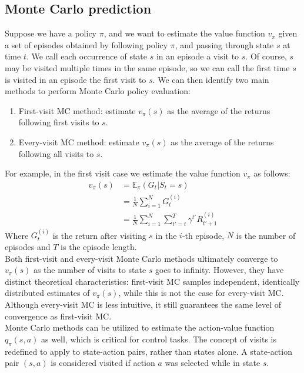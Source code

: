 \subsection{Monte Carlo prediction}
Suppose we have a policy $\pi$, and we want to estimate the value function $v_{\pi}$ given a set of episodes obtained by following policy $\pi$, and passing through state $s$ at time $t$. We call each occurrence of state $s$ in an episode a visit to $s$. Of course, $s$ may be visited multiple times in the same episode, so we can call the first time $s$ is visited in an episode the first visit to $s$. We can then identify two main methods to perform Monte Carlo policy evaluation:
\begin{enumerate}
    \item First-visit MC method: estimate $v_{\pi}(s)$ as the average of the returns following first visits to $s$.
    \item Every-visit MC method: estimate $v_{\pi}(s)$ as the average of the returns following all visits to $s$.
\end{enumerate}
For example, in the first visit case we estimate the value function $v_{\pi}$ as follows:
\begin{equation}
    \begin{split}
    v_{\pi}(s) & = \mathds{E}_{\pi}(G_t | S_t = s)\\
    & = \frac{1}{N} \sum_{i=1}^N G_t^{(i)}\\
    & = \frac{1}{N} \sum_{i=1}^N \sum_{t'=t}^{T} \gamma^{t'} R_{t'+1}^{(i)}
    \end{split}
    \label{mc-prediction}
\end{equation}
Where $G_t^{(i)}$ is the return after visiting $s$ in the $i$-th episode, $N$ is the number of episodes and $T$ is the episode length.\\
Both first-visit and every-visit Monte Carlo methods ultimately converge to $v_{\pi}(s)$ as the number of visits to state $s$ goes to infinity. However, they have distinct theoretical characteristics: first-visit MC samples independent, identically distributed estimates of $v_{\pi}(s)$, while this is not the case for every-visit MC. Although every-visit MC is less intuitive, it still guarantees the same level of convergence as first-visit MC.\\
Monte Carlo methods can be utilized to estimate the action-value function $q_{\pi}(s, a)$ as well, which is critical for control tasks. The concept of visits is redefined to apply to state-action pairs, rather than states alone. A state-action pair $(s, a)$ is considered visited if action $a$ was selected while in state $s$.

